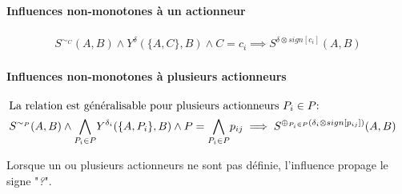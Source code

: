 \documentclass[11pt, a4paper]{article}
\begin{document}
\paragraph{ Influences non-monotones à un actionneur}
\begin{align*}
S^{\sim_C}(A,B) \wedge Y^\delta(\{A,C\},B) \wedge C = c_i \implies S^{\delta \otimes sign[c_i]}(A,B)
\end{align*}
\paragraph{ Influences non-monotones à plusieurs actionneurs}
\begin{align*}
\intertext{La relation est généralisable pour plusieurs actionneurs $P_i \in P$:}
&S^{\sim_P}(A,B) \wedge \underset{P_i\in P}{\bigwedge} Y^{\delta_i}(\{A, P_i\},B) \wedge P = \underset{P_i\in P}{\bigwedge}p_{ij} \implies S^{\oplus_{P_i\in P}(\delta_i\otimes sign[p_{ij}])}(A,B)
\end{align*}

Lorsque un ou plusieurs actionneurs ne sont pas définie, l'influence propage le signe "\emph{?}".
\end{document}
